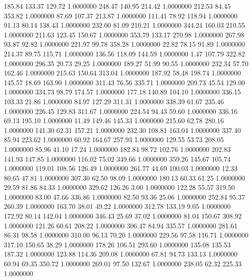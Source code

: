  185.84  133.37  129.72   1.0000000
 248.47  140.95  214.42   1.0000000
 212.53   84.45  353.82   1.0000000
  87.69  107.37  213.87   1.0000000
 111.41   78.92  118.94   1.0000000
  91.13   80.14  138.43   1.0000000
 232.00   81.09  210.21   1.0000000
 344.24  160.03  210.55   1.0000000
 211.63  123.45  150.67   1.0000000
 353.79  133.17  270.98   1.0000000
 267.98   93.87   92.82   1.0000000
 221.97   99.78  358.28   1.0000000
  22.82   78.15   91.89   1.0000000
 214.37   89.75  115.71   1.0000000
 136.56  118.09  144.59   1.0000000
   1.47  107.79  322.82   1.0000000
 296.35   20.73   29.25   1.0000000
 189.27   51.99   90.55   1.0000000
 232.34   57.70  162.46   1.0000000
 215.63  150.64  313.04   1.0000000
 187.92   58.48  198.74   1.0000000
 145.57   18.69  163.90   1.0000000
 311.43   76.56  335.71   1.0000000
 209.73   45.54  129.00   1.0000000
 334.73   98.79  174.57   1.0000000
 177.18  140.89  104.10   1.0000000
 336.15  103.33   21.86   1.0000000
  84.97  127.29  311.31   1.0000000
 338.39   61.67  235.46   1.0000000
 226.45  129.83  311.67   1.0000000
 224.54   94.43   59.60   1.0000000
 336.16   69.13  195.10   1.0000000
  11.49  149.46  145.33   1.0000000
 215.60   62.78  280.16   1.0000000
 141.30   62.31  157.21   1.0000000
 232.30  108.81  163.04   1.0000000
 337.40   85.94  223.62   1.0000000
  60.92  164.67  257.93   1.0000000
 129.55   53.73  208.05   1.0000000
  85.96   41.10   17.24   1.0000000
 182.84   98.72  102.76   1.0000000
 202.83  141.93  147.85   1.0000000
 116.02   75.02  349.66   1.0000000
 359.26  145.67  105.74   1.0000000
 119.01  108.56  126.49   1.0000000
 261.77   44.69  100.03   1.0000000
  12.33   80.65   47.81   1.0000000
 307.30   62.50   98.09   1.0000000
 180.13   60.33   61.25   1.0000000
  29.59   81.86   84.33   1.0000000
 329.62  126.26    3.00   1.0000000
 122.28   55.57  319.50   1.0000000
  83.00   47.66  336.86   1.0000000
  82.50   93.36   25.06   1.0000000
 252.84   95.37  260.39   1.0000000
 163.70   38.01   49.22   1.0000000
 312.78  133.19    9.05   1.0000000
 172.92   80.14  142.04   1.0000000
 346.43   25.69   37.02   1.0000000
  81.04  150.67  308.92   1.0000000
 121.26   60.61  208.22   1.0000000
 306.47   84.94  335.57   1.0000000
 281.61   86.31   98.58   1.0000000
 310.00   96.13   70.20   1.0000000
 229.56   97.58  116.71   1.0000000
 317.10  150.65   38.29   1.0000000
 178.26  106.51  293.60   1.0000000
 135.08  135.53  187.32   1.0000000
 123.88  114.36  209.08   1.0000000
  67.81   94.73  133.13   1.0000000
  60.94   69.35  350.72   1.0000000
 269.01   97.50  132.67   1.0000000
 238.05   62.32  225.33   1.0000000
